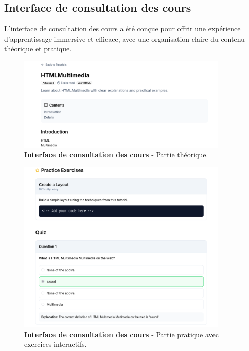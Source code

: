\subsection{Interface de consultation des cours}

L'interface de consultation des cours a été conçue pour offrir une expérience d'apprentissage immersive et efficace, avec une organisation claire du contenu théorique et pratique.

\begin{figure}[H]
  \centering
  \includegraphics[width=0.9\textwidth,keepaspectratio]{week_3_img/part1.png}
  \caption{\textbf{Interface de consultation des cours} - Partie théorique.}
  \label{fig:course_theory}
\end{figure}

\begin{figure}[H]
  \centering
  \includegraphics[width=0.9\textwidth,keepaspectratio]{week_3_img/part2.png}
  \caption{\textbf{Interface de consultation des cours} - Partie pratique avec exercices interactifs.}
  \label{fig:course_practice}
\end{figure}


